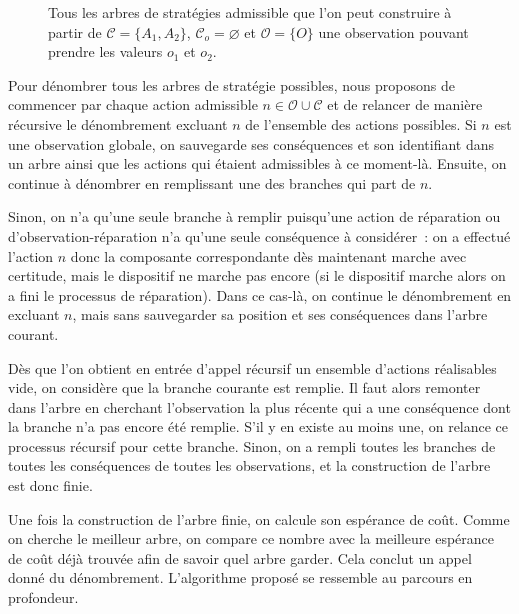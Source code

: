 \documentclass[a4paper,11pt]{article}
\theoremstyle{plain}
\theoremstyle{definition}
\begin{document}
\begin{figure}[ht]
\begin{subfigure}{.5\textwidth}
    \end{subfigure}

\caption{Tous les arbres de stratégies admissible que l'on peut construire à partir de $\mathcal C = \{A_1, A_2\}$, $\mathcal C_o = \varnothing$ et $\mathcal O = \{O\}$ une observation pouvant prendre les valeurs $o_1$ et $o_2$.}
\label{arbresDeStrategies}
\end{figure}

Pour dénombrer tous les arbres de stratégie possibles, nous proposons de commencer par chaque action admissible $n \in \mathcal O \cup \mathcal C$ et de relancer de manière récursive le dénombrement excluant $n$ de l'ensemble des actions possibles. Si $n$ est une observation globale, on sauvegarde ses conséquences et son identifiant dans un arbre ainsi que les actions qui étaient admissibles à ce moment-là. Ensuite, on continue à dénombrer en remplissant une des branches qui part de $n$.

Sinon, on n'a qu'une seule branche à remplir puisqu'une action de réparation ou d'observation-réparation n'a qu'une seule conséquence à considérer~: on a effectué l'action $n$ donc la composante correspondante dès maintenant marche avec certitude, mais le dispositif ne marche pas encore (si le dispositif marche alors on a fini le processus de réparation). Dans ce cas-là, on continue le dénombrement en excluant $n$, mais sans sauvegarder sa position et ses conséquences dans l'arbre courant.

Dès que l'on obtient en entrée d'appel récursif un ensemble d'actions réalisables vide, on considère que la branche courante est remplie. Il faut alors remonter dans l'arbre en cherchant l'observation la plus récente qui a une conséquence dont la branche n'a pas encore été remplie. S'il y en existe au moins une, on relance ce processus récursif pour cette branche. Sinon, on a rempli toutes les branches de toutes les conséquences de toutes les observations, et la construction de l'arbre est donc finie.

Une fois la construction de l'arbre finie, on calcule son espérance de coût. Comme on cherche le meilleur arbre, on compare ce nombre avec la meilleure espérance de coût déjà trouvée afin de savoir quel arbre garder. Cela conclut un appel donné du dénombrement. L'algorithme proposé se ressemble au parcours en profondeur.

\end{document}
